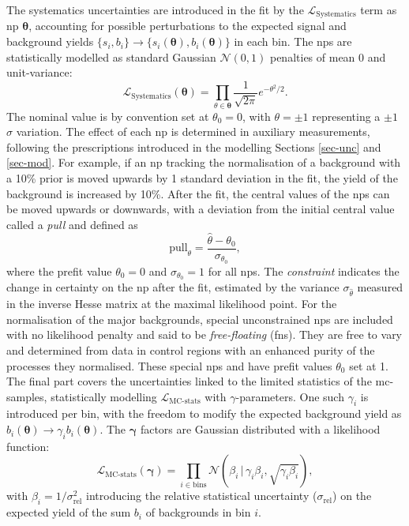 The systematics uncertainties are introduced in the fit by the $\mathcal{L}_{\text{Systematics}}$ term as \gls{np} $\boldsymbol{\theta}$, accounting for possible perturbations to the expected signal and background yields $\{s_i, b_i\} \rightarrow \{s_i(\boldsymbol{\theta}), b_i(\boldsymbol{\theta})\}$ in each bin. The \gls{np}s are statistically modelled as standard Gaussian $\mathcal{N}(0, 1)$ penalties of mean 0 and unit-variance: \[ \mathcal{L}_{\text{Systematics}}(\boldsymbol{\theta}) = \prod_{\theta \in \boldsymbol{\theta}} \frac{1}{\sqrt{2\pi}} e^{- \theta^2/2}.\] The nominal value is by convention set at $\theta_0 = 0$, with $\theta = \pm 1$ representing a $\pm1$ $\sigma$ variation. The effect of each \gls{np} is determined in auxiliary measurements, following the prescriptions introduced in the modelling Sections \ref{sec-unc} and \ref{sec-mod}. For example, if an \gls{np} tracking the normalisation of a background with a 10\% prior is moved upwards by 1 standard deviation in the fit, the yield of the background is increased by 10\%. After the fit, the central values of the \gls{np}s can be moved upwards or downwards, with a deviation from the initial central value called a \textit{pull} and defined as \[ \text{pull}_{\theta} = \frac{\hat{\theta} - \theta_0}{\sigma_{\theta_0}}, \] where the prefit value $\theta_0 = 0 $ and $\sigma_{\theta_0} = 1$ for all \gls{np}s. The \textit{constraint} indicates the change in certainty on the \gls{np} after the fit, estimated by the variance $\sigma_{\hat{\theta}}$ measured in the inverse Hesse matrix at the maximal likelihood point. For the normalisation of the major backgrounds, special unconstrained \gls{np}s are included with no likelihood penalty and said to be \textit{free-floating} (\gls{fn}s). They are free to vary and determined from data in control regions with an enhanced purity of the processes they normalised. These special \gls{np}s and have prefit values $\theta_0$ set at 1. \\

The final part covers the uncertainties linked to the limited statistics of the \gls{mc}-samples, statistically modelling $\mathcal{L}_{\text{MC-stats}}$ with $\gamma$-parameters. One such $\gamma_i$ is introduced per bin, with the freedom to modify the expected background yield as $b_i(\boldsymbol{\theta}) \rightarrow \gamma_i b_i(\boldsymbol{\theta})$. The $\boldsymbol{\gamma}$ factors are Gaussian distributed with a likelihood function: \[\mathcal{L}_{\text{MC-stats}}(\boldsymbol{\gamma}) = \prod_{i\in \textrm{bins}} \mathcal{N} \left(\beta_i \,|\, \gamma_i\beta_i, \sqrt{\gamma_i\beta_i} \right),\] with $\beta_i = 1 / \sigma_{\text{rel}}^2$ introducing the relative statistical uncertainty ($\sigma_{\text{rel}}$) on the expected yield of the sum $b_i$ of backgrounds in bin $i$. \\


